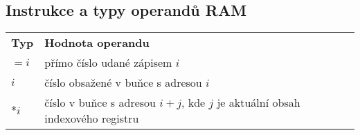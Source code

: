 \subsection{Instrukce a typy operandů RAM}
\begin{table}[H]
    \centering
    \begin{tabular}{l|l}
        \textbf{Typ} & \textbf{Hodnota operandu}                                                      \\ \hhline
        $=i$         & přímo číslo udané zápisem $i$                                                  \\
        $i$          & číslo obsažené v buňce s adresou $i$                                           \\
        $*i$         & číslo v buňce s adresou $i + j$, kde $j$ je aktuální obsah indexového registru
    \end{tabular}
\end{table}

